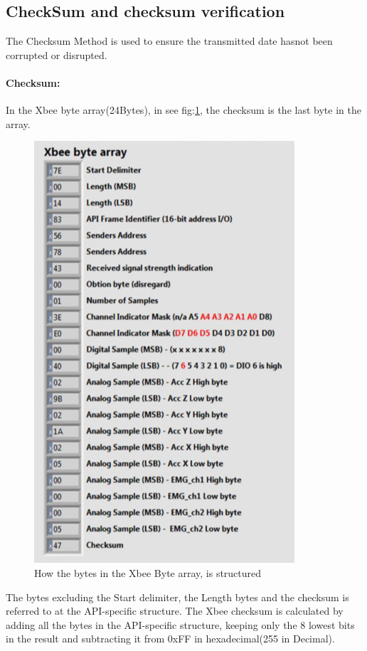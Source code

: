 \subsection{CheckSum and checksum verification}
The Checksum Method is used to ensure the transmitted date hasnot been corrupted or disrupted.
\paragraph{Checksum:}In the Xbee byte array(24Bytes), in see fig:\ref{fig:XbeeDataFromOldSolution}, the checksum is the last byte in the array.\\
\begin{figure}[H]
 \centering 
    \includegraphics[scale=0.7]{Figures/EMG/XbeeDataArray.png}
    \caption{How the bytes in the Xbee Byte array, is structured}
    \label{fig:XbeeDataFromOldSolution}
\end{figure}
The bytes excluding the Start delimiter, the Length bytes and the checksum is referred to at the API-specific structure. 
The Xbee checksum is calculated by adding all the bytes in the API-specific structure, keeping only the 8 lowest bits in the result and subtracting it from 0xFF in hexadecimal(255 in Decimal)\cite{Calculat82:online}.
